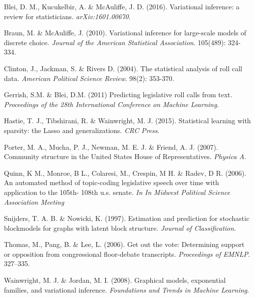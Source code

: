 \documentclass{article}
\begin{document}
\begin{thebibliography}{10}

 Blei, D. M., Kucukelbir, A. \& McAuliffe, J. D. (2016). Variational inference: a review for statisticians. {\sl arXiv:1601.00670}.

 Braun, M. \& McAuliffe, J. (2010). Variational inference for large-scale models of discrete choice. {\itshape Journal of the American Statistical Association}. 105(489): 324-334. 

 Clinton, J., Jackman, S. \& Rivers D. (2004). The statistical analysis of roll call data. {\itshape American Political Science Review}. 98(2): 353-370. 

 Gerrish, S.M. \& Blei, D.M. (2011) Predicting legislative roll calls from text. {\it Proceedings of the 28th International Conference on Machine Learning}.

 Hastie, T. J., Tibshirani, R. \& Wainwright, M. J. (2015). Statistical learning with sparsity: the Lasso and generalizations. {\itshape CRC Press}. 

 Porter, M. A., Mucha, P. J., Newman, M. E. J. \& Friend, A. J. (2007). Community structure in the United States House of Representatives. {\it Physica A}.

 Quinn, K M., Monroe, B L., Colaresi, M., Crespin, M H. \& Radev, D R. (2006). An automated method of topic-coding legislative
speech over time with application to the 105th-
108th u.s. senate. {\itshape In In Midwest Political Science
Association Meeting}

 Snijders, T. A. B. \& Nowicki, K. (1997). Estimation and prediction for stochastic blockmodels for graphs with latent block structure. {\itshape Journal of Classification}.

 Thomas, M., Pang, B. \& Lee, L. (2006). Get out
the vote: Determining support or opposition from
congressional floor-debate transcripts. {\itshape Proceedings
of EMNLP}. 327–335.

 Wainwright, M. J. \& Jordan, M. I. (2008). Graphical models, exponential families, and variational inference. {\sl Foundations and Trends in Machine Learning}. 

\end{thebibliography}

\appendix

\newpage
\end{document}
